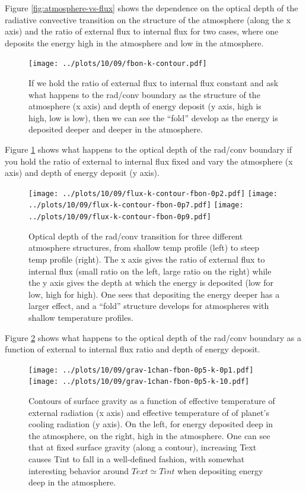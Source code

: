 \documentclass{emulateapj}
\begin{document}
Figure \ref{fig:atmosphere-vs-flux} shows the dependence on the
optical depth of the radiative convective transition on the structure
of the atmosphere (along the x axis) and the ratio of external flux to
internal flux for two cases, where one deposits the energy high in the
atmosphere and low in the atmosphere.  

\begin{figure}
  \centering
  \texttt{[image: ../plots/10/09/fbon-k-contour.pdf]}
  \caption{If we hold the ratio of external flux to internal flux
    constant and ask what happens to the rad/conv boundary as the
    structure of the atmosphere (x axis) and depth of energy deposit
    (y axis, high is high, low is low), then we can see the ``fold''
    develop as the energy is deposited deeper and deeper in the
    atmosphere.}
  \label{fig:atmosphere-vs-depth}
\end{figure}

Figure \ref{fig:atmosphere-vs-depth} shows what happens to the optical
depth of the rad/conv boundary if you hold the ratio of external to
internal flux fixed and vary the atmosphere (x axis) and depth of
energy deposit (y axis).  

\begin{figure}
  \centering
\texttt{[image: ../plots/10/09/flux-k-contour-fbon-0p2.pdf]}
\hfill
\texttt{[image: ../plots/10/09/flux-k-contour-fbon-0p7.pdf]}
\hfill
\texttt{[image: ../plots/10/09/flux-k-contour-fbon-0p9.pdf]}
\caption{Optical depth of the rad/conv transition for three different
  atmosphere structures, from shallow temp profile (left) to steep
  temp profile (right).  The x axis gives the ratio of external flux
  to internal flux (small ratio on the left, large ratio on the right)
  while the y axis gives the depth at which the energy is deposited
  (low for low, high for high).  One sees that depositing the energy
  deeper has a larger effect, and a ``fold'' structure develops for
  atmospheres with shallow temperature profiles.}
\label{fig:flux-vs-depth}
\end{figure}

Figure \ref{fig:flux-vs-depth} shows what happens to the optical depth
of the rad/conv boundary as a function of external to internal flux
ratio and depth of energy deposit.  

\begin{figure}
\texttt{[image: ../plots/10/09/grav-1chan-fbon-0p5-k-0p1.pdf]}
\texttt{[image: ../plots/10/09/grav-1chan-fbon-0p5-k-10.pdf]}
\caption{Contours of surface gravity as a function of effective
  temperature of external radiation (x axis) and effective temperature
of of planet's cooling radiation (y axis).  On the left, for energy
deposited deep in the atmosphere, on the right, high in the
atmosphere.   One can see that at fixed surface gravity (along a
contour), increasing Text causes Tint to fall in a well-defined
fashion, with somewhat interesting behavior around $Text \simeq Tint$
when depositing energy deep in the atmosphere.}
\label{fig:surf-grav-vs-text-and-tint}
\end{figure}
\end{document}
